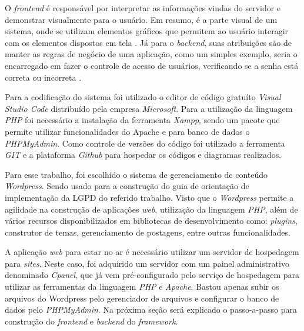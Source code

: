 \documentclass[
	12pt,				%
	openright,			%
	oneside,			%
	a4paper,			%
	english,			%
	french,				%
	spanish,			%
	brazil,				%
	]{abntex2}
\begin{document}
O \textit{frontend} é responsável por interpretar as informações vindas do servidor e demonstrar visualmente para o usuário. Em resumo, é a parte visual de um sistema, onde se utilizam elementos gráficos que permitem ao usuário interagir com os elementos dispostos em tela \cite{Alura}. Já para o \textit{backend}, suas atribuições são de manter as regras de negócio de uma aplicação, como um simples exemplo, seria o encarregado em fazer o controle de acesso de usuários, verificando se a senha está correta ou incorreta \cite{Rocketseat}.

Para a codificação do sistema foi utilizado o editor de código gratuíto \textit{Visual Studio Code} distribuído pela empresa \textit{Microsoft}. Para a utilização da linguagem \textit{PHP} foi necessário a instalação da ferramenta \textit{Xampp}, sendo um pacote que permite utilizar funcionalidades do Apache e para banco de dados o \textit{PHPMyAdmin}. Como controle de versões do código foi utilizado a ferramenta \textit{GIT} e a plataforma \textit{Github} para hospedar os códigos e diagramas realizados. 

Para esse trabalho, foi escolhido o sistema de gerenciamento de conteúdo  \textit{Wordpress}. Sendo usado para a construção do guia de orientação de implementação da LGPD do referido trabalho. Visto que o \textit{Wordpress} permite a agilidade na construção de aplicações \textit{web}, utilização da linguagem \textit{PHP}, além de vários recursos disponibilizados em bibliotecas de desenvolvimento como: \textit{plugins}, construtor de temas, gerenciamento de postagens, entre outras funcionalidades.

 A aplicação \textit{web} para estar no ar é necessário utilizar um servidor de hospedagem para \textit{sites}. Neste caso, foi adquirido um servidor com um painel administrativo denominado \textit{Cpanel}, que já vem pré-configurado pelo serviço de hospedagem para utilizar as ferramentas da linguagem \textit{PHP} e \textit{Apache}. Bastou apenas subir os arquivos do Wordpress pelo gerenciador de arquivos  e configurar o banco de dados pelo \textit{PHPMyAdmin}. Na próxima seção será explicado o passo-a-passo para construção do \textit{frontend} e \textit{backend} do \textit{framework}. 
 
\newpage
\end{document}
